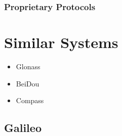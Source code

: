 \subsubsection{Proprietary Protocols}

\section{Similar Systems}

\begin{itemize}
\item Glonass
\item BeiDou
\item Compass
\end{itemize}

\subsection{Galileo}
\label{sec:galileo}
